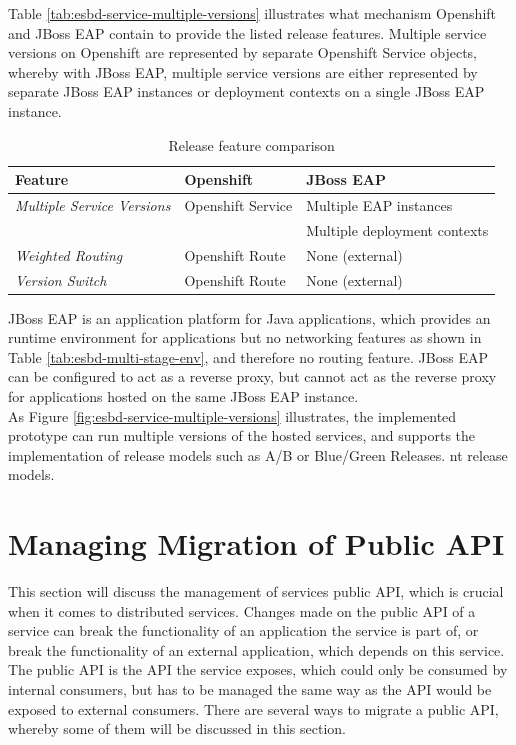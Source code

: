 Table \vref{tab:esbd-service-multiple-versions} illustrates what mechanism Openshift and JBoss EAP contain to provide the listed release features. Multiple service versions on Openshift are represented by separate Openshift Service objects, whereby with JBoss EAP, multiple service versions are either represented by separate JBoss EAP instances or deployment contexts on a single JBoss EAP instance.

{\renewcommand{\arraystretch}{1.2}%
	\begin{table}[h]
		\begin{tabularx}{\textwidth}{ X|X|X }	
			\textbf{Feature}                  & \textbf{Openshift}      & \textbf{JBoss EAP} \\  \hline
			\textit{Multiple Service Versions}& Openshift Service       & Multiple EAP instances \\
																	   && Multiple deployment contexts \\ \hline
			\textit{Weighted Routing}         & Openshift Route         & None (external) \\  \hline
			\textit{Version Switch}           & Openshift Route         & None (external) \\  \hline
		\end{tabularx}
		\caption{Release feature comparison}
		\label{tab:esbd-service-multiple-versions}
\end{table}}

JBoss EAP is an application platform for Java applications, which provides an runtime environment for applications but no networking features as shown in Table \vref{tab:esbd-multi-stage-env}, and therefore no routing feature. JBoss EAP can be configured to act as a reverse proxy, but cannot act as the reverse proxy for applications hosted on the same JBoss EAP instance. \\

As Figure \vref{fig:esbd-service-multiple-versions} illustrates, the implemented prototype can run multiple versions of the hosted services, and supports the implementation of release models such as A/B or Blue/Green Releases. nt release models.

\section{Managing Migration of Public API}
\label{sec:esbd-multi-stage-env}
This section will discuss the management of services public API, which is crucial when it comes to distributed services. Changes made on the public API of a service can break the functionality of an application the service is part of, or break the functionality of an external application, which depends on this service. The public API is the API the service exposes, which could only be consumed by internal consumers, but has to be managed the same way as the API would be exposed to external consumers. There are several ways to migrate a public API, whereby some of them will be discussed in this section. \\  

